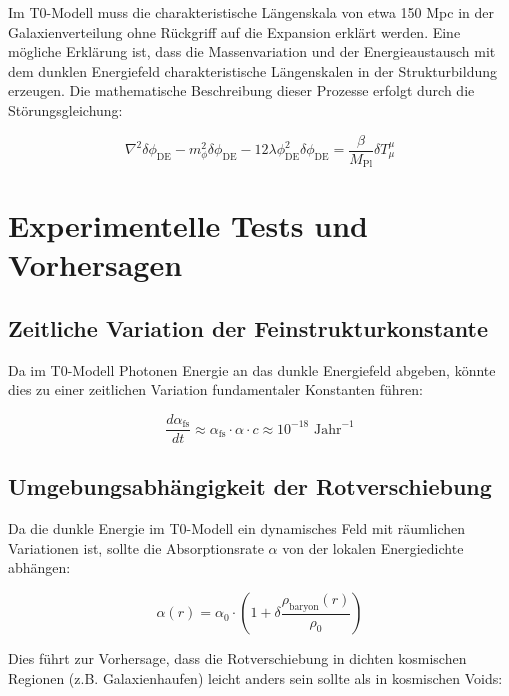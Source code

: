 \documentclass[a4paper,12pt]{article}
\theoremstyle{definition}
\theoremstyle{remark}
\begin{document}
	Im T0-Modell muss die charakteristische Längenskala von etwa 150 Mpc in der Galaxienverteilung ohne Rückgriff auf die Expansion erklärt werden. Eine mögliche Erklärung ist, dass die Massenvariation und der Energieaustausch mit dem dunklen Energiefeld charakteristische Längenskalen in der Strukturbildung erzeugen. Die mathematische Beschreibung dieser Prozesse erfolgt durch die Störungsgleichung:
	
	\begin{equation}
		\nabla^2 \delta\phi_{\text{DE}} - m_{\phi}^2 \delta\phi_{\text{DE}} - 12\lambda\phi_{\text{DE}}^2 \delta\phi_{\text{DE}} = \frac{\beta}{M_{\text{Pl}}}\delta T^{\mu}_{\mu}
	\end{equation}
	
	\section{Experimentelle Tests und Vorhersagen}
	
	\subsection{Zeitliche Variation der Feinstrukturkonstante}
	
	Da im T0-Modell Photonen Energie an das dunkle Energiefeld abgeben, könnte dies zu einer zeitlichen Variation fundamentaler Konstanten führen:
	
	\begin{equation}
		\frac{d\alpha_{\text{fs}}}{dt} \approx \alpha_{\text{fs}} \cdot \alpha \cdot c \approx 10^{-18} \text{ Jahr}^{-1}
	\end{equation}
	
	\subsection{Umgebungsabhängigkeit der Rotverschiebung}
	
	Da die dunkle Energie im T0-Modell ein dynamisches Feld mit räumlichen Variationen ist, sollte die Absorptionsrate $\alpha$ von der lokalen Energiedichte abhängen:
	
	\begin{equation}
		\alpha(r) = \alpha_0 \cdot \left(1 + \delta\frac{\rho_{\text{baryon}}(r)}{\rho_0}\right)
	\end{equation}
	
	Dies führt zur Vorhersage, dass die Rotverschiebung in dichten kosmischen Regionen (z.B. Galaxienhaufen) leicht anders sein sollte als in kosmischen Voids:
	
\end{document}
